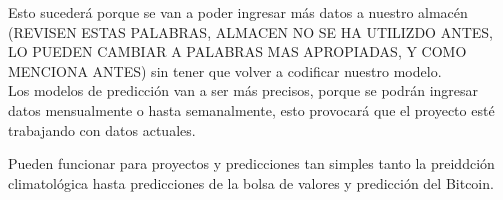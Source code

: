     Esto sucederá porque se van a poder ingresar m\'as datos a nuestro almacén (REVISEN ESTAS PALABRAS, ALMACEN NO SE HA UTILIZDO ANTES, LO PUEDEN CAMBIAR A PALABRAS MAS APROPIADAS, Y COMO MENCIONA ANTES) sin 
    tener que volver a codificar nuestro modelo.\\
    Los modelos de predicci\'on van a ser m\'as precisos, porque se podrán ingresar 
    datos mensualmente o hasta semanalmente, esto provocar\'a que el proyecto est\'e trabajando 
    con datos actuales.

    Pueden funcionar para proyectos y predicciones tan simples tanto la preiddci\'on climatol\'ogica
    hasta predicciones de la bolsa de valores y predicci\'on del Bitcoin.

